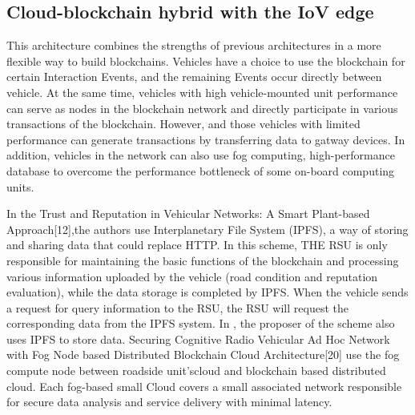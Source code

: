 \subsection{Cloud-blockchain hybrid with the IoV edge}
This architecture combines the strengths of previous architectures in a more flexible way to build blockchains. Vehicles have a choice to use the blockchain for certain Interaction Events, and the remaining Events occur directly between vehicle. At the same time, vehicles with high vehicle-mounted unit performance can serve as nodes in the blockchain network and directly participate in various transactions of the blockchain. However, and those vehicles with limited performance can generate transactions by transferring data to gatway devices. In addition, vehicles in the network can also use fog computing, high-performance database to overcome the performance bottleneck of some on-board computing units. 

In the Trust and Reputation in Vehicular Networks: A Smart Plant-based Approach[12],the authors use Interplanetary File System (IPFS), a way of storing and sharing data that could replace HTTP. In this scheme, THE RSU is only responsible for maintaining the basic functions of the blockchain and processing various information uploaded by the vehicle (road condition and reputation evaluation), while the data storage is completed by IPFS. When the vehicle sends a request for query information to the RSU, the RSU will request the corresponding data from the IPFS system. In \cite{ref42}, the proposer of the scheme also uses IPFS to store data.
Securing Cognitive Radio Vehicular Ad Hoc Network with Fog Node based Distributed Blockchain Cloud Architecture[20] use the fog compute node between roadside unit’scloud and blockchain based distributed cloud. Each fog-based small Cloud covers a small associated network responsible for secure data analysis and service delivery with minimal latency.

